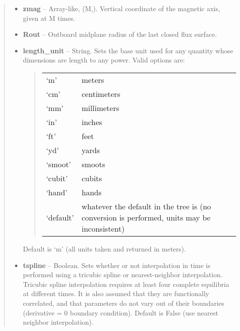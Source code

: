 \documentclass[letterpaper,10pt,english]{sphinxmanual}
\begin{document}
\begin{fulllineitems}
\begin{quote}
\begin{description}
\begin{itemize}
\item {} 
\textbf{zmag} -- Array-like, (M,).
Vertical coordinate of the magnetic axis, given at M times.

\item {} 
\textbf{Rout} -- Outboard midplane radius of the last closed flux surface.

\item {} 
\textbf{length\_unit} -- 
String.
Sets the base unit used for any quantity whose
dimensions are length to any power. Valid options are:
\begin{quote}

\begin{tabulary}{\linewidth}{|L|L|}
\hline

`m'
 & 
meters
\\

`cm'
 & 
centimeters
\\

`mm'
 & 
millimeters
\\

`in'
 & 
inches
\\

`ft'
 & 
feet
\\

`yd'
 & 
yards
\\

`smoot'
 & 
smoots
\\

`cubit'
 & 
cubits
\\

`hand'
 & 
hands
\\

`default'
 & 
whatever the default in the tree is (no conversion is performed, units may be inconsistent)
\\
\hline\end{tabulary}

\end{quote}

Default is `m' (all units taken and returned in meters).


\item {} 
\textbf{tspline} -- Boolean.
Sets whether or not interpolation in time is
performed using a tricubic spline or nearest-neighbor
interpolation. Tricubic spline interpolation requires at least
four complete equilibria at different times. It is also assumed
that they are functionally correlated, and that parameters do
not vary out of their boundaries (derivative = 0 boundary
condition). Default is False (use nearest neighbor interpolation).


\end{itemize}
\end{description}
\end{quote}
\end{fulllineitems}
\end{document}
